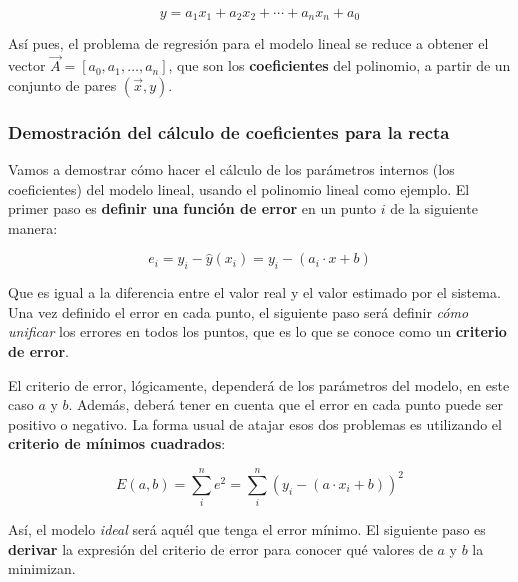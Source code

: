 \documentclass[11pt]{scrartcl}
\begin{document}
$$
y = a_1x_1 + a_2x_2 + \cdots + a_nx_n + a_0
$$

Así pues, el problema de regresión para el modelo lineal se reduce a obtener el
vector $\vec{A} = [a_0, a_1, \ldots, a_n]$, que son los \textbf{coeficientes}
del polinomio, a partir de un conjunto de pares $(\vec{x}, y)$.





\subsubsection{Demostración del cálculo de coeficientes para la recta}

Vamos a demostrar cómo hacer el cálculo de los parámetros internos (los
coeficientes) del modelo lineal, usando el polinomio lineal como ejemplo. El
primer paso es \textbf{definir una función de error} en un punto $i$ de la
siguiente manera:

$$
e_i = y_i - \hat{y}(x_i) = y_i - (a_i \cdot x + b)
$$

Que es igual a la diferencia entre el valor real y el valor estimado por el
sistema. Una vez definido el error en cada punto, el siguiente paso será definir
\textit{cómo unificar} los errores en todos los puntos, que es lo que se conoce
como un \textbf{criterio de error}.

El criterio de error, lógicamente, dependerá de los parámetros del modelo, en
este caso $a$ y $b$. Además, deberá tener en cuenta que el error en cada punto
puede ser positivo o negativo. La forma usual de atajar esos dos problemas es
utilizando el \textbf{criterio de mínimos cuadrados}:

$$
E(a,b) = \sum_i^n e^2 = \sum_i^n (y_i - (a \cdot x_i + b))^2
$$

Así, el modelo \textit{ideal} será aquél que tenga el error mínimo. El siguiente
paso es \textbf{derivar} la expresión del criterio de error para conocer qué
valores de $a$ y $b$ la minimizan.
\end{document}

